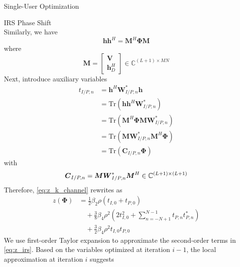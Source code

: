 \documentclass{IEEEtran}
\begin{document}
\begin{section}{Single-User Optimization}
\begin{subsection}{IRS Phase Shift}
\begin{equation}
		\end{equation}
		Similarly, we have
		\begin{equation}
			\boldsymbol{h}\boldsymbol{h}^H=\boldsymbol{M}^H\boldsymbol{\Phi}\boldsymbol{M}
		\end{equation}
		where
		\begin{equation}\label{eq:M}
			\boldsymbol{M}=
			\begin{bmatrix}
				\boldsymbol{V} \\
				\boldsymbol{h}_D^H
			\end{bmatrix} \in \mathbb{C}^{(L+1) \times MN}
		\end{equation}
		Next, introduce auxiliary variables
		\begin{equation}\label{eq:t}
			\begin{split}
				t_{I/P,n}
				&=\boldsymbol{h}^H\boldsymbol{W}_{I/P,n}^*\boldsymbol{h}\\
				&=\mathrm{Tr}(\boldsymbol{h}\boldsymbol{h}^H\boldsymbol{W}_{I/P,n}^*)\\
				&=\mathrm{Tr}(\boldsymbol{M}^H\boldsymbol{\Phi}\boldsymbol{M}\boldsymbol{W}_{I/P,n}^*)\\
				&=\mathrm{Tr}(\boldsymbol{M}\boldsymbol{W}_{I/P,n}^*\boldsymbol{M}^H\boldsymbol{\Phi})\\
				&=\mathrm{Tr}(\boldsymbol{C}_{I/P,n}\boldsymbol{\Phi})
			\end{split}
		\end{equation}
		with
		\begin{equation}\label{eq:C_{I/P,n}}
			\boldsymbol{C}_{I/P,n}=\boldsymbol{M}\boldsymbol{W}_{I/P,n}^*\boldsymbol{M}^H \in \mathbb{C}^{(L+1)\times(L+1)}
		\end{equation}
		Therefore, \ref{eq:z_k_channel} rewrites as
		\begin{equation}\label{eq:z_irs}
			\begin{split}
				z(\boldsymbol{\Phi})
				&=\frac{1}{2}{\beta_2}{\rho}(t_{I,0}+t_{P,0})\\
				&\quad+\frac{3}{8}{\beta_4}{\rho^2} \left(2t_{I,0}^2 + \sum_{n=-N+1}^{N-1}{t_{P,n}t_{P,n}^*}\right)\\
				&\quad+\frac{3}{2}{\beta_4}{\rho^2}t_{I,0}t_{P,0}
			\end{split}
		\end{equation}
		We use first-order Taylor expansion to approximate the second-order terms in \ref{eq:z_irs}. Based on the variables optimized at iteration $i - 1$, the local approximation at iteration $i$ suggests \cite{Adali2010}
		\begin{align}

\end{align}
\end{subsection}
\end{section}
\end{document}
